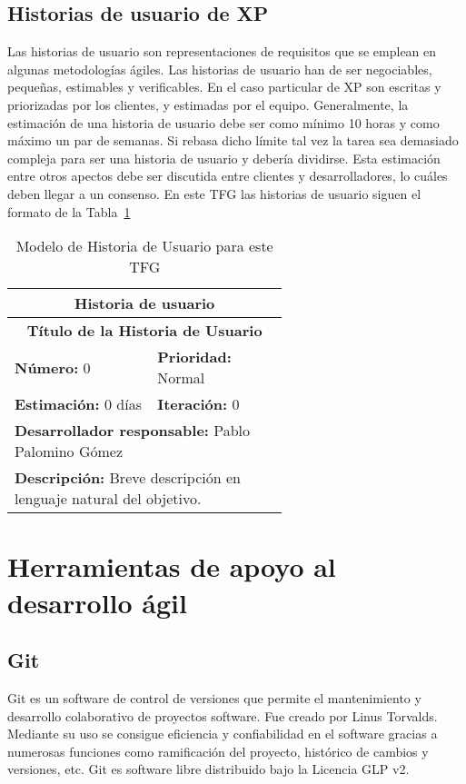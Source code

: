 \subsection{Historias de usuario de XP}
Las historias de usuario son representaciones de requisitos que se emplean en algunas metodologías ágiles. Las historias de usuario han de ser negociables, pequeñas, estimables y verificables. En el caso particular de \gls{XP} son escritas y priorizadas por los clientes, y estimadas por el equipo. Generalmente, la estimación de una historia de usuario debe ser como mínimo 10 horas y como máximo un par de semanas. Si rebasa dicho límite tal vez la tarea sea demasiado compleja para ser una historia de usuario y debería dividirse. Esta estimación entre otros apectos debe ser discutida entre clientes y desarrolladores, lo cuáles deben llegar a un consenso. En este \gls{TFG} las historias de usuario siguen el formato de la Tabla~\ref{tab:histModel}
\begin{table}[H]
        \centering
        \begin{tabular}{|p{0.3\linewidth}|p{0.3\linewidth}|}
          \hline
          \multicolumn{2}{|c|}{Historia de usuario}\\ \hline
          \multicolumn{2}{|c|}{\textbf{Título de la Historia de Usuario}}\\ \hline
          \textbf{Número:} 0  & \textbf{Prioridad:} Normal  \\ \hline
          \textbf{Estimación:} 0 días  & \textbf{Iteración:} 0 \\ \hline
          \multicolumn{2}{|l|}{\textbf{Desarrollador responsable:} Pablo Palomino Gómez}\\ \hline
          \multicolumn{2}{|p{0.6\linewidth}|}{\textbf{Descripción:} Breve descripción en lenguaje natural del objetivo.}\\ \hline
        \end{tabular}
        \caption{Modelo de Historia de Usuario para este TFG}
        \label{tab:histModel}
\end{table}

\section{Herramientas de apoyo al desarrollo ágil}
\subsection{Git}
Git es un software de control de versiones que permite el mantenimiento y desarrollo colaborativo de proyectos software. Fue creado por Linus Torvalds. Mediante su uso se consigue eficiencia y confiabilidad en el software gracias a numerosas funciones como ramificación del proyecto, histórico de cambios y versiones, etc. Git es software libre distribuido bajo la Licencia \gls{GLP} v2.\\
